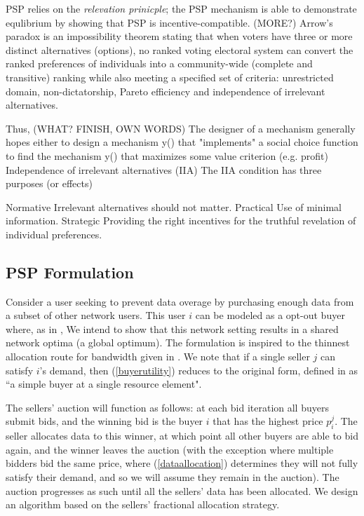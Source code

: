 \documentclass[12pt]{article}
\theoremstyle{definition}
\begin{document}
\begin{multicols}{2}
PSP relies on the \emph{relevation prinicple}; the
PSP mechanism is able to demonstrate equlibrium by showing that PSP is
incentive-compatible. (MORE?)
Arrow's paradox is an impossibility theorem stating that when voters have three
or more distinct alternatives (options), no ranked voting electoral system can
convert the ranked preferences of individuals into a community-wide (complete
and transitive) ranking while also meeting a specified set of criteria:
unrestricted domain, non-dictatorship, Pareto efficiency and independence of
irrelevant alternatives.

Thus, (WHAT? FINISH, OWN WORDS)
The designer of a mechanism generally hopes either to design a mechanism
y() that "implements" a social choice function to find the
mechanism y() that maximizes some value criterion (e.g. profit)
Independence of irrelevant alternatives (IIA)
The IIA condition has three purposes (or effects)

Normative
Irrelevant alternatives should not matter.
Practical
Use of minimal information.
Strategic
Providing the right incentives for the truthful revelation of individual
preferences. 

\subsection{PSP Formulation}
Consider a user seeking to prevent
data overage by purchasing enough data from a subset of other network users.
This user $i$ can be modeled as a opt-out buyer where, as in \cite{semret},
We intend to show that this network setting results in a shared network optima (a
global optimum). The formulation is inspired to the thinnest allocation route for
bandwidth given in \cite{lazar}. We note that if a single seller $j$ can
satisfy $i$'s demand, then
(\ref{buyerutility}) reduces to the original form, defined in
\cite{semret} as ``a simple buyer at a single resource element".

The sellers' auction will function as follows: at each bid iteration all buyers
submit bids, and the winning bid is the buyer $i$ that has the highest price
$p_i^j$. The seller allocates
data to this winner, at which point all other buyers are able to bid again, and
the winner leaves the auction (with the exception where multiple bidders bid
the same price, where (\ref{dataallocation}) determines they will not fully
satisfy their demand, and so we will assume they remain in the auction). The auction progresses as such until all the
sellers' data has been allocated. We design an algorithm based on the sellers'
fractional allocation strategy.


\end{multicols}
\end{document}
